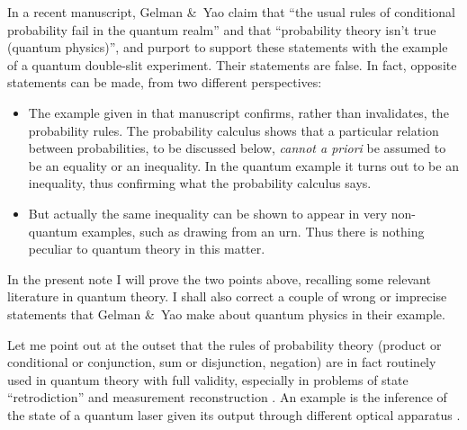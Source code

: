 \documentclass[\ifafour a4paper,12pt,\else a5paper,10pt,\fi%
onecolumn,oneside,article,%
british%
]{memoir}
\theoremstyle{remark}
\theoremstyle{innote}
\newcommand*{\citep}{\parencites}%
\newcommand*{\citey}{\parencites*}
\newcommand*{\amp}{\&}
\renewcommand*{\|}[1][]{\nonscript\,#1\vert\nonscript\;\mathopen{}}
\newcommand*{\sect}{\S}%
\newcommand*{\chaps}{chs}%
\begin{document}
In a recent manuscript, Gelman \amp\ Yao \citey{gelmanetal2020} claim that
\enquote{the usual rules of conditional probability fail in the quantum
  realm} and that \enquote{probability theory isn't true (quantum physics)}, and
purport to support these statements with the example of a quantum
double-slit experiment. Their statements are
false. %
In fact, opposite statements can be made, from two different
perspectives: %
\begin{itemize}
\item The example given in that manuscript confirms, rather than
  invalidates, the probability rules. The probability calculus shows that a
  particular relation between probabilities, to be discussed below,
  \emph{cannot a priori} be assumed to be an equality or an inequality. In
  the quantum example it turns out to be an inequality, thus confirming
  what the probability calculus says.
\item But actually the same inequality can be shown to appear in very
  non-quantum examples, such as drawing from an urn. Thus there is nothing
  peculiar to quantum theory in this matter.
\end{itemize}

In the present note I will prove the two points above, recalling some
relevant literature in quantum theory. I shall also correct a couple of
wrong or imprecise statements that Gelman \amp\ Yao make about quantum
physics in their example.

Let me point out at the outset that the rules of probability theory
(product or conditional or conjunction, sum or disjunction, negation) are
in fact routinely used in quantum theory with full validity, especially in
problems of state \enquote{retrodiction} and measurement reconstruction
\citep{jones1991b,slater1995b}[\chaps~7,8]{demuynck2002b}{barnettetal2003,zimanetal2004_r2006,darianoetal2004}[see][\sect~1
and the rest of the present note for many further
references]{maanssonetal2006}. An example is the inference of the state of
a quantum laser given its output through different optical apparatus
\citep{leonhardt1997}.
\end{document}
